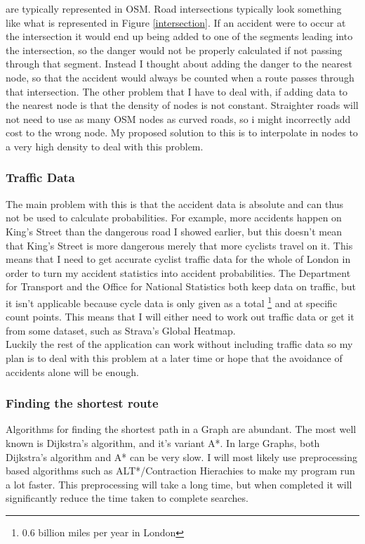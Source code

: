 \documentclass[11pt,twoside,a4paper]{article}
\begin{document}
are typically represented in OSM. Road intersections typically look something like what is represented in Figure \ref{intersection}. If an accident were to occur at the intersection it would end up being added to one of the segments leading into the intersection, so the danger would not be properly calculated if not passing through that segment. Instead I thought about adding the danger to the nearest node, so that the accident would always be counted when a route passes through that intersection.
The other problem that I have to deal with, if adding data to the nearest node is that the density of nodes is not constant. Straighter roads will not need to use as many OSM nodes as curved roads, so i might incorrectly add cost to the wrong node. My proposed solution to this is to interpolate in nodes to a very high density to deal with this problem.
\subsubsection{Traffic Data}
The main problem with this is that the accident data is absolute and can thus not be used to calculate probabilities. For example, more accidents happen on King's Street than the dangerous road I showed earlier, but this doesn't mean that King's Street is more dangerous merely that more cyclists travel on it. This means that I need to get accurate cyclist traffic data for the whole of London in order to turn my accident statistics into accident probabilities.
The Department for Transport and the Office for National Statistics both keep data on traffic, but it isn't applicable because cycle data is only given as a total \footnote{0.6 billion miles per year in London} and at specific count points.
This means that I will either need to work out traffic data or get it from some dataset, such as Strava's Global Heatmap. \\
Luckily the rest of the application can work without including traffic data so my plan is to deal with this problem at a later time or hope that the avoidance of accidents alone will be enough.  
\subsubsection{Finding the shortest route}
Algorithms for finding the shortest path in a Graph are abundant. The most well known is Dijkstra's algorithm, and it's variant A*. In large Graphs, both Dijkstra's algorithm and A* can be very slow. I will most likely use preprocessing based algorithms such as ALT*/Contraction Hierachies to make my program run a lot faster.
This preprocessing will take a long time, but when completed it will significantly reduce the time taken to complete searches. 
\end{document}
